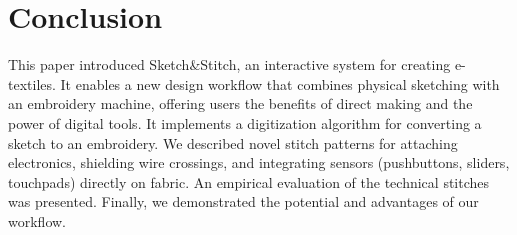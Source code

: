 \documentclass[header.tex]{subfiles}
\begin{document}


\section{Conclusion}
This paper introduced Sketch\&Stitch, an interactive system for creating e-textiles. It enables a new design workflow that combines physical sketching with an embroidery machine, offering users the benefits of direct making and the power of digital tools. %
It implements a digitization algorithm for converting a sketch to an embroidery. We described novel stitch patterns for attaching electronics, shielding wire crossings, and integrating sensors (pushbuttons, sliders, touchpads) directly on fabric. An empirical evaluation of the technical stitches was presented. Finally, we demonstrated the potential and advantages of our workflow.




\balance{}



\end{document}

